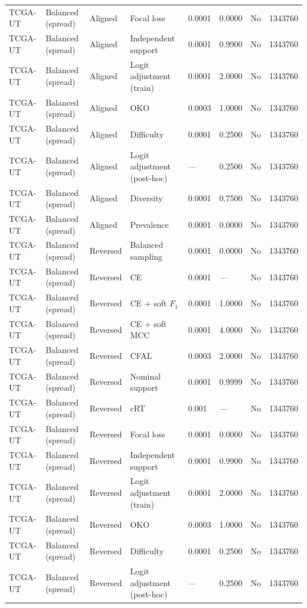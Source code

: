 \begin{longtable}{lllllllr}
TCGA-UT & Balanced (spread) & Aligned & Focal loss & 0.0001 & 0.0000 & No & 1343760 \\
TCGA-UT & Balanced (spread) & Aligned & Independent support & 0.0001 & 0.9900 & No & 1343760 \\
TCGA-UT & Balanced (spread) & Aligned & Logit adjustment (train) & 0.0001 & 2.0000 & No & 1343760 \\
TCGA-UT & Balanced (spread) & Aligned & OKO & 0.0003 & 1.0000 & No & 1343760 \\
TCGA-UT & Balanced (spread) & Aligned & Difficulty & 0.0001 & 0.2500 & No & 1343760 \\
TCGA-UT & Balanced (spread) & Aligned & Logit adjustment (post-hoc) & --- & 0.2500 & No & 1343760 \\
TCGA-UT & Balanced (spread) & Aligned & Diversity & 0.0001 & 0.7500 & No & 1343760 \\
TCGA-UT & Balanced (spread) & Aligned & Prevalence & 0.0001 & 0.0000 & No & 1343760 \\
TCGA-UT & Balanced (spread) & Reversed & Balanced sampling & 0.0001 & 0.0000 & No & 1343760 \\
TCGA-UT & Balanced (spread) & Reversed & CE & 0.0001 & --- & No & 1343760 \\
TCGA-UT & Balanced (spread) & Reversed & CE + soft $F_1$ & 0.0001 & 1.0000 & No & 1343760 \\
TCGA-UT & Balanced (spread) & Reversed & CE + soft MCC & 0.0001 & 4.0000 & No & 1343760 \\
TCGA-UT & Balanced (spread) & Reversed & CFAL & 0.0003 & 2.0000 & No & 1343760 \\
TCGA-UT & Balanced (spread) & Reversed & Nominal support & 0.0001 & 0.9999 & No & 1343760 \\
TCGA-UT & Balanced (spread) & Reversed & cRT & 0.001 & --- & No & 1343760 \\
TCGA-UT & Balanced (spread) & Reversed & Focal loss & 0.0001 & 0.0000 & No & 1343760 \\
TCGA-UT & Balanced (spread) & Reversed & Independent support & 0.0001 & 0.9900 & No & 1343760 \\
TCGA-UT & Balanced (spread) & Reversed & Logit adjustment (train) & 0.0001 & 2.0000 & No & 1343760 \\
TCGA-UT & Balanced (spread) & Reversed & OKO & 0.0003 & 1.0000 & No & 1343760 \\
TCGA-UT & Balanced (spread) & Reversed & Difficulty & 0.0001 & 0.2500 & No & 1343760 \\
TCGA-UT & Balanced (spread) & Reversed & Logit adjustment (post-hoc) & --- & 0.2500 & No & 1343760 \\

\end{longtable}

